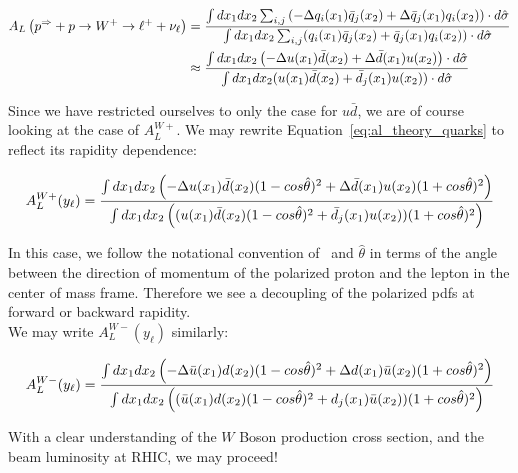 \begin{align}\label{eq:al_theory_quarks}
  {
    A_L
    \left(
      p^{\Rightarrow}+p\rightarrow W^+ \rightarrow \ell^+ +\nu_{\ell}
    \right)
  } &=  
  {
    {
      \int dx_1 dx_2 \sum_{i,j}
      \left(
        -\Delta q_i(x_1)\bar{q}_j(x_2)
        +\Delta \bar{q}_j(x_1)q_i(x_2)
      \right)\cdot d \hat{\sigma}
    }
    \over
    {
      \int dx_1 dx_2
      \sum_{i,j}(q_i(x_1)\bar{q}_j(x_2)+\bar{q}_j(x_1)q_i(x_2))\cdot d\hat{\sigma}
    }
 }\\
 & \approx  \nonumber
 {
   {
      \int dx_1 dx_2 
      \left(
        -\Delta u(x_1)\bar{d}(x_2)
        +\Delta \bar{d}(x_1)u(x_2)
      \right)\cdot d \hat{\sigma}
   }
   \over
   {
      \int dx_1 dx_2 (u(x_1)\bar{d}(x_2)+\bar{d}_j(x_1)u(x_2))\cdot d\hat{\sigma}
   }
 }
\end{align}

Since we have restricted ourselves to only the case for $u\bar{d}$, we are of
course looking at the case of $A_L^{W+}$. We may rewrite
Equation~\ref{eq:al_theory_quarks} to reflect its rapidity dependence:

\begin{equation}
  {A_L^{W+}(y_{\ell})} = 
  {
    {
     \int dx_1 dx_2 
     \left(
       -\Delta u(x_1)\bar{d}(x_2)(1-cos\hat{\theta})^2
       +\Delta \bar{d}(x_1)u(x_2)(1+cos\hat{\theta})^2
     \right)
    }
    \over
    {
       \int dx_1 dx_2 
       \left(
       (u(x_1)\bar{d}(x_2)   (1-cos\hat{\theta})^2
      +\bar{d}_j(x_1)u(x_2)) (1+cos\hat{\theta})^2
        \right)
    }
  }
  \label{eq:al_w_pos_rapidity_dependance}
\end{equation}

In this case, we follow the notational convention of~\cite{Oide2012} and 
$\hat{\theta}$ in terms of the angle between the direction of momentum of the
polarized proton and the lepton in the center of mass frame. Therefore we see
a decoupling of the polarized pdfs at forward or backward rapidity.\\

{\noindent}We may write $A_L^{W-}(y_{\ell})$ similarly:

\begin{equation}
  {A_L^{W-}(y_{\ell})} = 
  {
    {
     \int dx_1 dx_2 
     \left(
       -\Delta \bar{u}(x_1)d(x_2)(1-cos\hat{\theta})^2
       +\Delta d(x_1)\bar{u}(x_2)(1+cos\hat{\theta})^2
     \right)
    }
    \over
    {
       \int dx_1 dx_2 
       \left(
         (\bar{u}(x_1)d(x_2)   (1-cos\hat{\theta})^2
         +d_j(x_1)\bar{u}(x_2)) (1+cos\hat{\theta})^2
        \right)
    }
  }
  \label{eq:al_w_neg_rapidity_dependance}
\end{equation}
\clearpage

With a clear understanding of the $W$ Boson production cross section, and the beam
luminosity at RHIC, we may proceed!

